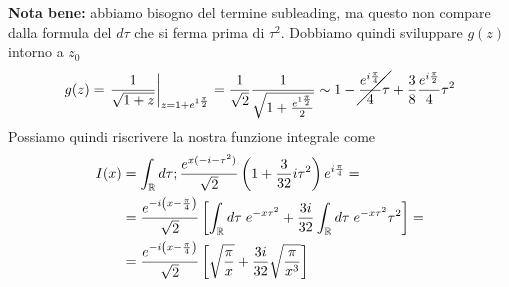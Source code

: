 \textbf{Nota bene:} abbiamo bisogno del termine subleading, ma questo non compare dalla formula del $d\tau$ che si ferma prima di $\tau^2$. Dobbiamo quindi sviluppare $g(z)$ intorno a $z_0$
\begin{align}
	g(z) = \left. \frac{1}{\sqrt{1+z}} \right|_{z=1 + e^{1\frac{\pi}{2}}} = \frac{1}{\sqrt{2}} \frac{1}{\sqrt{1 + \frac{e^{1\frac{\pi}{2}}}{2}}} \sim 1 - \cancel{\frac{e^{i\frac{\pi}{4}}}{4}\tau} + \frac{3}{8} \frac{e^{i\frac{\pi}{2}}}{4} \tau^2
\end{align}
Possiamo quindi riscrivere la nostra funzione integrale come
\begin{align}
	I(x) &= \int_{\mathbb{R}} d\tau; \frac{e^{x(-i-\tau^2)}}{\sqrt{2}} \left( 1  + \frac{3}{32} i \tau^2 \right)e^{i\frac{\pi}{4}} = \nonumber \\
	&= \frac{e^{-i\left( x-\frac{\pi}{4} \right)}}{\sqrt{2}}\left[ \int_{\mathbb{R}} d\tau  \; e^{-x\tau^2}  + \frac{3i}{32} \int_{\mathbb{R}} d\tau \; e^{-x\tau^2} \tau^2\right] = \nonumber \\
	&= \frac{e^{-i\left( x-\frac{\pi}{4} \right)}}{\sqrt{2}}\left[ \sqrt{\frac{\pi}{x}}   + \frac{3i}{32} \sqrt{\frac{\pi}{x^3}} \right]
\end{align}